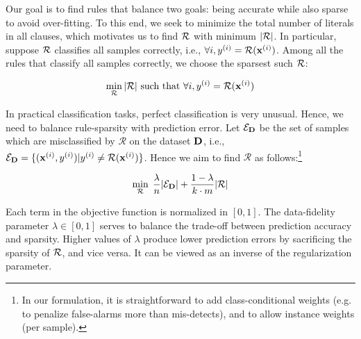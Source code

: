 Our goal is to find rules that balance two 
goals:   being accurate while also sparse to avoid over-fitting.  
To this end, we seek to minimize the total number of literals in all clauses, which motivates us to  find $ {\mathcal{R}}  $ with minimum  $ |{\mathcal{R}}| $. In particular, suppose $ {\mathcal{R}} $ classifies all samples correctly, i.e., $ \forall i, y^{(i)}={\mathcal{R}}(\mathbf{x}^{(i)}) $. Among all the rules that classify all samples correctly,  we choose the sparsest  such $ {\mathcal{R}} $: 


\[
\min\limits_{\mathcal{R}} |\mathcal{R}|\text{ such that }\forall i, y^{(i)}={\mathcal{R}}(\mathbf{x}^{(i)})
\]



In practical classification tasks, perfect classification is very unusual. Hence, we need to balance rule-sparsity with prediction error.  Let $ \mathcal{E}_{\mathbf{D}} $   be  the set of samples which are misclassified  by $ \mathcal{R} $ on the dataset $ \mathbf{D} $, i.e., $ \mathcal{E}_{\mathbf{D}} = \{(\mathbf{x}^{(i)},y^{(i)}) | y^{(i)} \ne \mathcal{R}(\mathbf{x}^{(i)}) \} $. Hence we aim to find $ \mathcal{R} $ as follows:\footnote{In our formulation, it is  straightforward to add class-conditional weights  (e.g. to penalize  false-alarms more than mis-detects), and to allow instance weights (per sample).}

\[
\min\limits_{\mathcal{R}} \;  \frac{\lambda}{n}|\mathcal{E}_{\mathbf{D}}| + \frac{1-\lambda}{k\cdot m} |\mathcal{R}|  
\]

Each term in the  objective function is normalized in $ [0,1] $. 
The data-fidelity parameter $ \lambda \in [0,1] $  serves to balance
the trade-off between prediction accuracy and sparsity. Higher 
values of $ \lambda $ produce lower prediction errors by sacrificing the sparsity 
of $ {\mathcal{R}} $, and vice versa. It can be viewed as an inverse of the regularization 
parameter. 